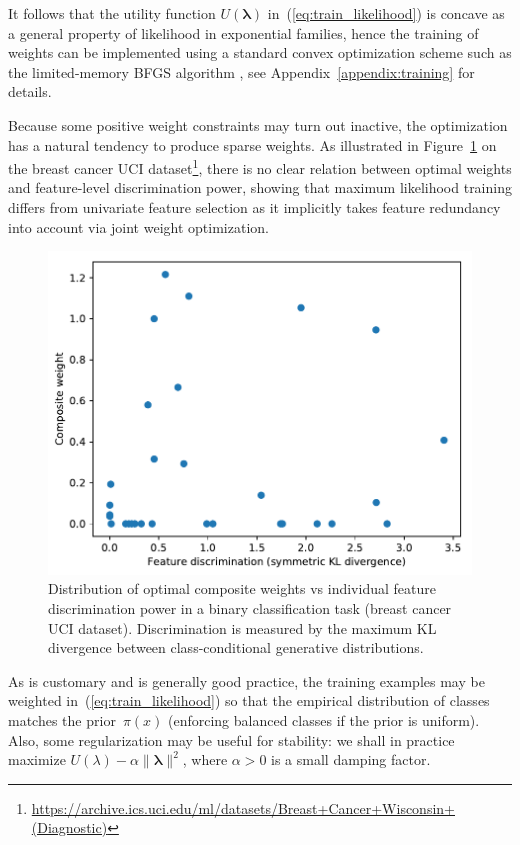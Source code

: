 \documentclass[english]{scrartcl}
\newcommand{\blambda}{{\boldsymbol{\lambda}}}
\begin{document}
It follows that the utility function $U(\blambda)$ in~(\ref{eq:train_likelihood}) is concave as a general property of likelihood in exponential families, hence the training of weights can be implemented using a standard convex optimization scheme such as the limited-memory BFGS algorithm \cite{Byrd-95}, see Appendix~\ref{appendix:training} for details. 

Because some positive weight constraints may turn out inactive, the optimization has a natural tendency to produce sparse weights. As illustrated in Figure~\ref{fig:disc_weight_plot} on the breast cancer UCI dataset\footnote{\url{https://archive.ics.uci.edu/ml/datasets/Breast+Cancer+Wisconsin+(Diagnostic)}}, there is no clear relation between optimal weights and feature-level discrimination power, showing that maximum likelihood training differs from univariate feature selection as it implicitly takes feature redundancy into account via joint weight optimization.

\begin{figure}[!ht]
  \begin{center}
    \includegraphics[width=.6\textwidth]{disc_weight_plot.pdf}
  \end{center}
\caption{Distribution of optimal composite weights vs individual feature discrimination power in a binary classification task (breast cancer UCI dataset). Discrimination is measured by the maximum KL divergence between class-conditional generative distributions.}
\label{fig:disc_weight_plot}
\end{figure}

As is customary and is generally good practice, the training examples may be weighted in~(\ref{eq:train_likelihood}) so that the empirical distribution of classes matches the prior~$\pi(x)$ (enforcing balanced classes if the prior is uniform). Also, some regularization may be useful for stability: we shall in practice maximize $U(\lambda)-\alpha \|\blambda\|^2$, where $\alpha>0$ is a small damping factor.
\end{document}
